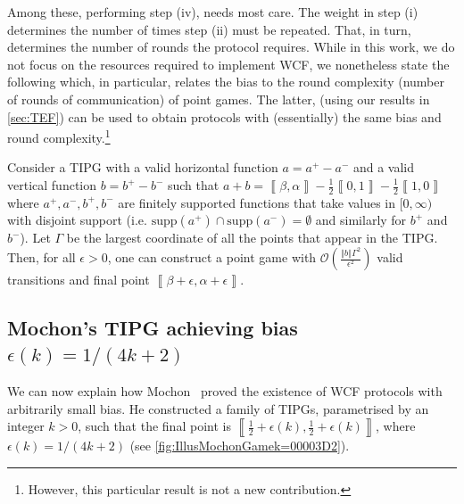 \documentclass{article}
\newcommand{\supp}{\text{supp}}
\begin{document}
Among these, performing step (iv), needs most care. The weight in step (i) determines the number of times step (ii) must be repeated. That, in turn, determines the number of rounds the protocol requires. While in this work, we do not focus on the resources required to implement WCF, we nonetheless state the following which, in particular, relates the bias to the round complexity (number of rounds of communication) of point games. The latter, (using our results in \cref{sec:TEF}) can be used to obtain protocols with (essentially) the same bias and round complexity.\footnote{However, this particular result is not a new contribution.}
%
%
%
%
%
%
%
%
%
%
%
%
%
%



%

\begin{corollary}
  Consider a TIPG with a valid horizontal function $a=a^{+}-a^{-}$
  and a valid vertical function $b=b^{+}-b^{-}$ such that $a+b=\left\llbracket \beta,\alpha\right\rrbracket -\frac{1}{2}\left\llbracket 0,1\right\rrbracket -\frac{1}{2}\left\llbracket 1,0\right\rrbracket $ where $a^+,a^-,b^+,b^-$ are finitely supported functions that take values in $[0,\infty)$ with disjoint support (i.e. $\supp(a^+)\cap \supp(a^-)=\emptyset$ and similarly for $b^+$ and $b^-$).
  Let $\Gamma$ be the largest coordinate of all the points that appear
  in the TIPG. Then, for all $\epsilon>0$, one can construct a point
  game with $\mathcal{O}\left(\frac{\left\Vert b\right\Vert \Gamma^{2}}{\epsilon^{2}}\right)$
  valid transitions and final point $\left\llbracket \beta+\epsilon,\alpha+\epsilon\right\rrbracket $.\label{cor:numberOfTransitionsForValidPointGames}
\end{corollary}

%

\subsection{Mochon's TIPG achieving bias \texorpdfstring{$\epsilon(k)=1/(4k+2)$}{epsilon(k)=1/(4k+2)}}\label{subsec:mochontipg}
We can now explain how Mochon~\cite{Mochon07} proved the existence of WCF protocols with arbitrarily small bias. He constructed a family of TIPGs, parametrised by an integer $k>0$, such that the final point is $\left\llbracket \frac{1}{2}+\epsilon(k),\frac{1}{2}+\epsilon(k)\right\rrbracket $, where $\epsilon(k)=1/(4k+2)$ (see  \cref{fig:IllusMochonGamek=00003D2}). %
\end{document}
